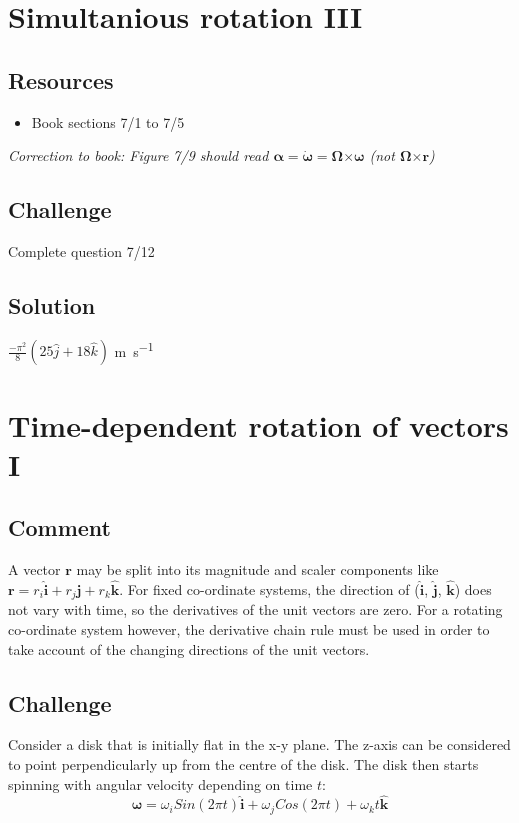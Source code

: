 \newpage
\section{Simultanious rotation III}

\subsection*{Resources}
\begin{itemize}
    \item Book sections 7/1 to 7/5
\end{itemize}

\emph{Correction to book: Figure 7/9 should read $\bm{\alpha} = \bm{\dot{\omega}} = \bm{\Omega} \bm{\times} \bm{\omega}$ (not $\bm{\Omega} \bm{\times} \bm{r}$)}

\subsection*{Challenge}
Complete question 7/12


\subsection*{Solution}
$\frac{-\pi^2}{8}(25 \hat{j} + 18 \hat{k})$ \si{\meter\per\second}




\newpage
\section{Time-dependent rotation of vectors I}

\subsection*{Comment}
A vector $\bm{r}$ may be split into its magnitude and scaler components like $\bm{r} = r_i \bm{\hat{i}} + r_j \bm{\hat{j}} + r_k \bm{\hat{k}}$. For fixed co-ordinate systems, the direction of ($\bm{\hat{i}}$, $\bm{\hat{j}}$, $\bm{\hat{k}}$) does not vary with time, so the derivatives of the unit vectors are zero. For a rotating co-ordinate system however, the derivative chain rule must be used in order to take account of the changing directions of the unit vectors.

\subsection*{Challenge}
Consider a disk that is initially flat in the x-y plane. The z-axis can be considered to point perpendicularly up from the centre of the disk. The disk then starts spinning with angular velocity depending on time $t$:
\begin{equation}
    \bm{\omega} = \omega_i Sin(2 \pi t) \bm{\hat{i}} + \omega_j Cos(2 \pi t) + \omega_k t \bm{\hat{k}}
\end{equation}

